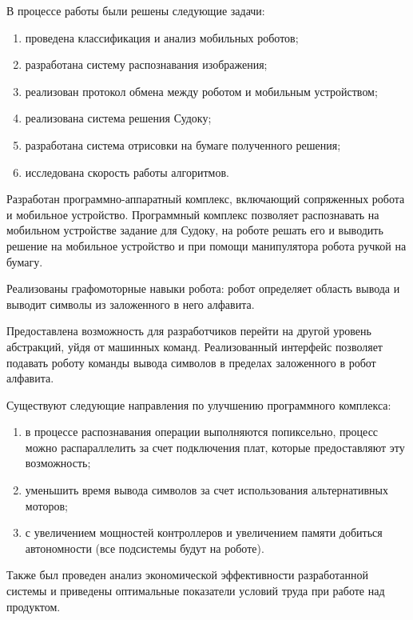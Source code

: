 \Conclusion %

В процессе работы были решены следующие задачи:

\begin{enumerate}
    \item проведена классификация и анализ мобильных роботов;
	\item разработана систему распознавания изображения;
	\item реализован протокол обмена между роботом и мобильным устройством; 
	\item реализована система решения Судоку;
	\item разработана система отрисовки на бумаге полученного решения;
	\item исследована скорость работы алгоритмов.
\end{enumerate}

Разработан программно-аппаратный комплекс, включающий сопряженных робота и мобильное устройство. Программный комплекс позволяет распознавать на мобильном устройстве задание для Судоку, на роботе решать его и выводить решение на мобильное устройство и при помощи манипулятора робота ручкой на бумагу.

Реализованы графомоторные навыки робота: робот определяет область вывода и выводит символы из заложенного в него алфавита.

Предоставлена возможность для разработчиков перейти на другой уровень абстракций, уйдя от машинных команд. Реализованный интерфейс позволяет подавать роботу команды вывода символов в пределах заложенного в робот алфавита.

Существуют следующие направления по улучшению программного комплекса:

\begin{enumerate}
    \item в процессе распознавания операции выполняются попиксельно, процесс можно распараллелить за счет подключения плат, которые предоставляют эту возможность;
	\item уменьшить время вывода символов за счет использования альтернативных моторов;
	\item с увеличением мощностей контроллеров и увеличением памяти добиться автономности (все подсистемы будут на роботе).
\end{enumerate}


Также был проведен анализ экономической эффективности разработанной системы и приведены оптимальные показатели условий труда при работе над продуктом.



